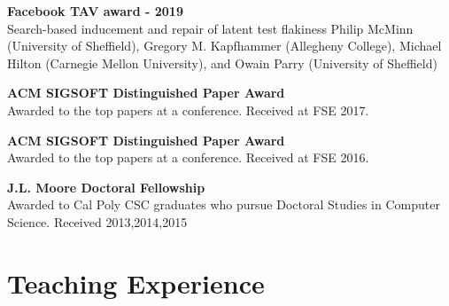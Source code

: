 \documentclass[10pt]{article}
\begin{document}
\textbf{Facebook TAV award - 2019}\\
Search-based inducement and repair of latent test flakiness
Philip McMinn (University of Sheffield), Gregory M. Kapfhammer (Allegheny College), Michael Hilton (Carnegie Mellon University), and Owain Parry (University of Sheffield)


\textbf{ACM SIGSOFT Distinguished Paper Award}\\
Awarded to the top papers at a conference. Received at FSE 2017.

\textbf{ACM SIGSOFT Distinguished Paper Award}\\
Awarded to the top papers at a conference. Received at FSE 2016.

\textbf{J.L. Moore Doctoral Fellowship}  \\
Awarded to Cal Poly CSC graduates who pursue Doctoral Studies in Computer Science. Received 2013,2014,2015



%
%
%





\section{Teaching Experience}
\end{document}
